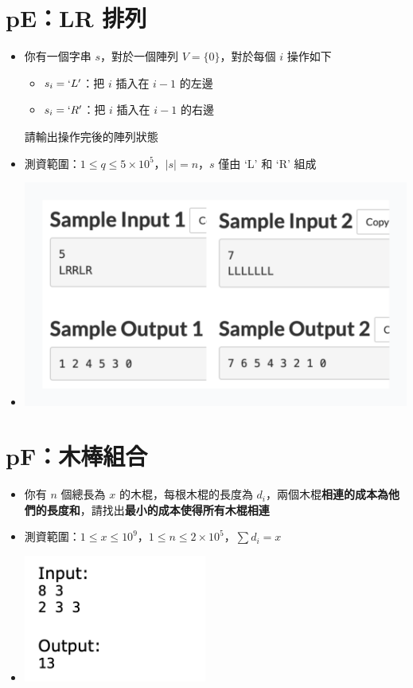\documentclass[12pt]{article}
\begin{document}
\pagebreak

\section*{pE：LR 排列}

\begin{itemize}[label={}, itemsep=0pt]
    \item 你有一個字串 $s$，對於一個陣列 $V=\{0\}$，對於每個 $i$ 操作如下
    \begin{itemize}[label={-}, itemsep=0pt]
        \item $s_i = `L'$：把 $i$ 插入在 $i-1$ 的左邊
        \item $s_i = `R'$：把 $i$ 插入在 $i-1$ 的右邊
    \end{itemize}
    請輸出操作完後的陣列狀態
    \item 測資範圍：$1 \leq q \leq 5 \times 10^5$，$\mid s \mid = n$，$s$ 僅由 `L' 和 `R' 組成
    \item \begin{center}\includegraphics[width=13.0cm]{img/pE}\end{center}
\end{itemize}

\section*{pF：木棒組合}

\begin{itemize}[label={}, itemsep=0pt]
    \item 你有 $n$ 個總長為 $x$ 的木棍，每根木棍的長度為 $d_i$，兩個木棍\textbf{相連的成本為他們的長度和}，請找出\textbf{最小的成本使得所有木棍相連}
    \item 測資範圍：$1 \leq x \leq 10^9$，$1 \leq n \leq 2 \times 10^5$，$\sum d_i = x$
    \item \begin{center}\includegraphics[width=6.0cm]{img/pF}\end{center}
\end{itemize}
\end{document}
